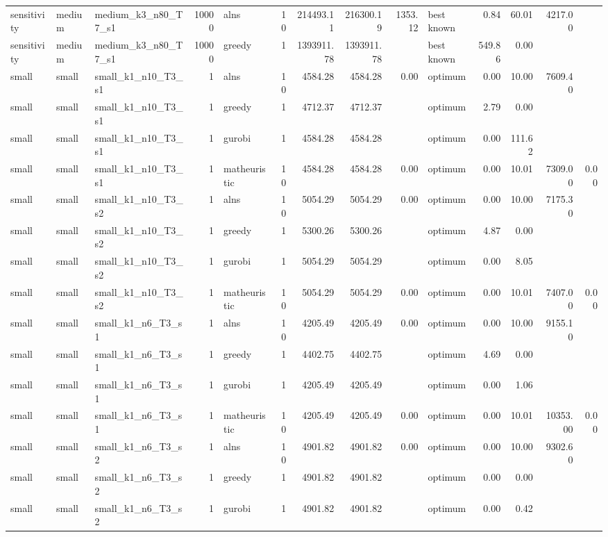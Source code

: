 \begin{tabular}{lllrlrrrrlrrrr}
sensitivity & medium & medium\_k3\_n80\_T7\_s1 & 10000 & alns & 10 & 214493.11 & 216300.19 & 1353.12 & best known & 0.84 & 60.01 & 4217.00 &  \\
sensitivity & medium & medium\_k3\_n80\_T7\_s1 & 10000 & greedy & 1 & 1393911.78 & 1393911.78 &  & best known & 549.86 & 0.00 &  &  \\
small & small & small\_k1\_n10\_T3\_s1 & 1 & alns & 10 & 4584.28 & 4584.28 & 0.00 & optimum & 0.00 & 10.00 & 7609.40 &  \\
small & small & small\_k1\_n10\_T3\_s1 & 1 & greedy & 1 & 4712.37 & 4712.37 &  & optimum & 2.79 & 0.00 &  &  \\
small & small & small\_k1\_n10\_T3\_s1 & 1 & gurobi & 1 & 4584.28 & 4584.28 &  & optimum & 0.00 & 111.62 &  &  \\
small & small & small\_k1\_n10\_T3\_s1 & 1 & matheuristic & 10 & 4584.28 & 4584.28 & 0.00 & optimum & 0.00 & 10.01 & 7309.00 & 0.00 \\
small & small & small\_k1\_n10\_T3\_s2 & 1 & alns & 10 & 5054.29 & 5054.29 & 0.00 & optimum & 0.00 & 10.00 & 7175.30 &  \\
small & small & small\_k1\_n10\_T3\_s2 & 1 & greedy & 1 & 5300.26 & 5300.26 &  & optimum & 4.87 & 0.00 &  &  \\
small & small & small\_k1\_n10\_T3\_s2 & 1 & gurobi & 1 & 5054.29 & 5054.29 &  & optimum & 0.00 & 8.05 &  &  \\
small & small & small\_k1\_n10\_T3\_s2 & 1 & matheuristic & 10 & 5054.29 & 5054.29 & 0.00 & optimum & 0.00 & 10.01 & 7407.00 & 0.00 \\
small & small & small\_k1\_n6\_T3\_s1 & 1 & alns & 10 & 4205.49 & 4205.49 & 0.00 & optimum & 0.00 & 10.00 & 9155.10 &  \\
small & small & small\_k1\_n6\_T3\_s1 & 1 & greedy & 1 & 4402.75 & 4402.75 &  & optimum & 4.69 & 0.00 &  &  \\
small & small & small\_k1\_n6\_T3\_s1 & 1 & gurobi & 1 & 4205.49 & 4205.49 &  & optimum & 0.00 & 1.06 &  &  \\
small & small & small\_k1\_n6\_T3\_s1 & 1 & matheuristic & 10 & 4205.49 & 4205.49 & 0.00 & optimum & 0.00 & 10.01 & 10353.00 & 0.00 \\
small & small & small\_k1\_n6\_T3\_s2 & 1 & alns & 10 & 4901.82 & 4901.82 & 0.00 & optimum & 0.00 & 10.00 & 9302.60 &  \\
small & small & small\_k1\_n6\_T3\_s2 & 1 & greedy & 1 & 4901.82 & 4901.82 &  & optimum & 0.00 & 0.00 &  &  \\
small & small & small\_k1\_n6\_T3\_s2 & 1 & gurobi & 1 & 4901.82 & 4901.82 &  & optimum & 0.00 & 0.42 &  &  \\

\end{tabular}
